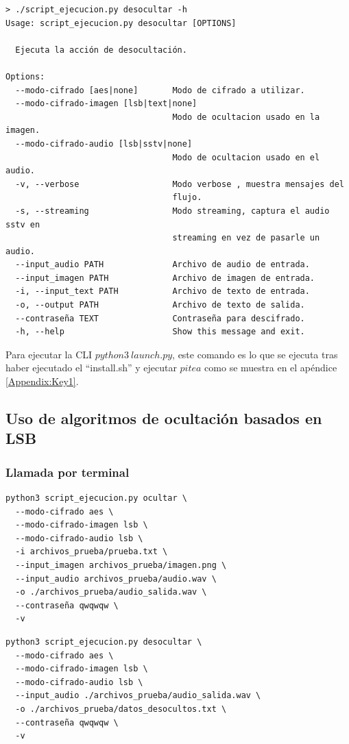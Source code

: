 \begin{verbatim}
> ./script_ejecucion.py desocultar -h
Usage: script_ejecucion.py desocultar [OPTIONS]

  Ejecuta la acción de desocultación.

Options:
  --modo-cifrado [aes|none]       Modo de cifrado a utilizar.
  --modo-cifrado-imagen [lsb|text|none]
                                  Modo de ocultacion usado en la imagen.
  --modo-cifrado-audio [lsb|sstv|none]
                                  Modo de ocultacion usado en el audio.
  -v, --verbose                   Modo verbose , muestra mensajes del
                                  flujo.
  -s, --streaming                 Modo streaming, captura el audio sstv en
                                  streaming en vez de pasarle un audio.
  --input_audio PATH              Archivo de audio de entrada.
  --input_imagen PATH             Archivo de imagen de entrada.
  -i, --input_text PATH           Archivo de texto de entrada.
  -o, --output PATH               Archivo de texto de salida.
  --contraseña TEXT               Contraseña para descifrado.
  -h, --help                      Show this message and exit.
\end{verbatim}

Para ejecutar la CLI $ python3\ launch.py$, este comando es lo que se ejecuta tras haber ejecutado el ``install.sh'' y ejecutar $pitea$ como se muestra en el apéndice \ref{Appendix:Key1}.

\subsection{Uso de algoritmos de ocultación basados en LSB}
\subsubsection{Llamada por terminal}
\begin{verbatim}
python3 script_ejecucion.py ocultar \
  --modo-cifrado aes \
  --modo-cifrado-imagen lsb \
  --modo-cifrado-audio lsb \
  -i archivos_prueba/prueba.txt \
  --input_imagen archivos_prueba/imagen.png \
  --input_audio archivos_prueba/audio.wav \
  -o ./archivos_prueba/audio_salida.wav \
  --contraseña qwqwqw \
  -v
\end{verbatim}

\begin{verbatim}
python3 script_ejecucion.py desocultar \
  --modo-cifrado aes \
  --modo-cifrado-imagen lsb \
  --modo-cifrado-audio lsb \
  --input_audio ./archivos_prueba/audio_salida.wav \
  -o ./archivos_prueba/datos_desocultos.txt \
  --contraseña qwqwqw \
  -v
\end{verbatim}
\newpage
